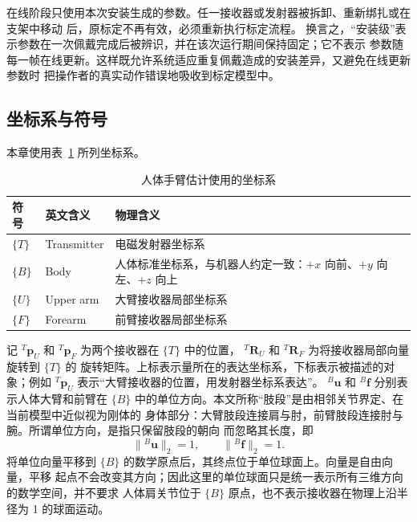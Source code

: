在线阶段只使用本次安装生成的参数。任一接收器或发射器被拆卸、重新绑扎或在支架中移动
后，原标定不再有效，必须重新执行标定流程。
换言之，“安装级”表示参数在一次佩戴完成后被辨识，并在该次运行期间保持固定；它不表示
参数随每一帧在线更新。这样既允许系统适应重复佩戴造成的安装差异，又避免在线更新参数时
把操作者的真实动作错误地吸收到标定模型中。

\subsection{坐标系与符号}
\label{subsec:ch4_frames_notation}

本章使用表~\ref{tab:ch4_coordinate_frames} 所列坐标系。
\begin{table}[htbp]
  \centering
  \caption{人体手臂估计使用的坐标系}
  \label{tab:ch4_coordinate_frames}
  \begin{tabularx}{\linewidth}{@{}llX@{}}
    \toprule
    符号 & 英文含义 & 物理含义 \\
    \midrule
    $\{T\}$ & Transmitter & 电磁发射器坐标系 \\
    $\{B\}$ & Body & 人体标准坐标系，与机器人约定一致：$+x$ 向前、$+y$ 向左、$+z$ 向上 \\
    $\{U\}$ & Upper arm & 大臂接收器局部坐标系 \\
    $\{F\}$ & Forearm & 前臂接收器局部坐标系 \\
    \bottomrule
  \end{tabularx}
\end{table}

记 ${}^{T}\boldsymbol p_U$ 和 ${}^{T}\boldsymbol p_F$ 为两个接收器在 $\{T\}$ 中的位置，
${}^{T}\boldsymbol R_U$ 和 ${}^{T}\boldsymbol R_F$ 为将接收器局部向量旋转到 $\{T\}$ 的
旋转矩阵。上标表示量所在的表达坐标系，下标表示被描述的对象；例如
${}^{T}\boldsymbol p_U$ 表示“大臂接收器的位置，用发射器坐标系表达”。
${}^{B}\boldsymbol u$ 和 ${}^{B}\boldsymbol f$ 分别表示人体大臂和前臂在
$\{B\}$ 中的单位方向。本文所称“肢段”是由相邻关节界定、在当前模型中近似视为刚体的
身体部分：大臂肢段连接肩与肘，前臂肢段连接肘与腕。所谓单位方向，是指只保留肢段的朝向
而忽略其长度，即
\begin{equation}
  \lVert{}^{B}\boldsymbol u\rVert_2=1,
  \qquad
  \lVert{}^{B}\boldsymbol f\rVert_2=1.
  \label{eq:ch4_unit_segment_directions}
\end{equation}
将单位向量平移到 $\{B\}$ 的数学原点后，其终点位于单位球面上。向量是自由向量，平移
起点不会改变其方向；因此这里的单位球面只是统一表示所有三维方向的数学空间，并不要求
人体肩关节位于 $\{B\}$ 原点，也不表示接收器在物理上沿半径为 1 的球面运动。

